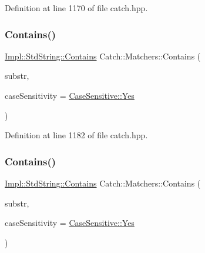 Definition at line 1170 of file catch.\+hpp.

\hypertarget{namespace_catch_1_1_matchers_a07760045eca8bafb7f6618fae10f1b59}{}\label{namespace_catch_1_1_matchers_a07760045eca8bafb7f6618fae10f1b59} 
\subsubsection{\texorpdfstring{Contains()}{Contains()}\hspace{0.1cm}{\footnotesize\ttfamily [1/2]}}
{\footnotesize\ttfamily \hyperlink{struct_catch_1_1_matchers_1_1_impl_1_1_std_string_1_1_contains}{Impl\+::\+Std\+String\+::\+Contains} Catch\+::\+Matchers\+::\+Contains (\begin{DoxyParamCaption}\item[{std\+::string const \&}]{substr,  }\item[{\hyperlink{struct_catch_1_1_case_sensitive_aad49d3aee2d97066642fffa919685c6a}{Case\+Sensitive\+::\+Choice}}]{case\+Sensitivity = {\ttfamily \hyperlink{struct_catch_1_1_case_sensitive_aad49d3aee2d97066642fffa919685c6aa7c5550b69ec3c502e6f609b67f9613c6}{Case\+Sensitive\+::\+Yes}} }\end{DoxyParamCaption})\hspace{0.3cm}{\ttfamily [inline]}}



Definition at line 1182 of file catch.\+hpp.

\hypertarget{namespace_catch_1_1_matchers_a7bc27b5c696118cbe54690d6c524b3d9}{}\label{namespace_catch_1_1_matchers_a7bc27b5c696118cbe54690d6c524b3d9} 
\subsubsection{\texorpdfstring{Contains()}{Contains()}\hspace{0.1cm}{\footnotesize\ttfamily [2/2]}}
{\footnotesize\ttfamily \hyperlink{struct_catch_1_1_matchers_1_1_impl_1_1_std_string_1_1_contains}{Impl\+::\+Std\+String\+::\+Contains} Catch\+::\+Matchers\+::\+Contains (\begin{DoxyParamCaption}\item[{const char $\ast$}]{substr,  }\item[{\hyperlink{struct_catch_1_1_case_sensitive_aad49d3aee2d97066642fffa919685c6a}{Case\+Sensitive\+::\+Choice}}]{case\+Sensitivity = {\ttfamily \hyperlink{struct_catch_1_1_case_sensitive_aad49d3aee2d97066642fffa919685c6aa7c5550b69ec3c502e6f609b67f9613c6}{Case\+Sensitive\+::\+Yes}} }\end{DoxyParamCaption})\hspace{0.3cm}{\ttfamily [inline]}}



